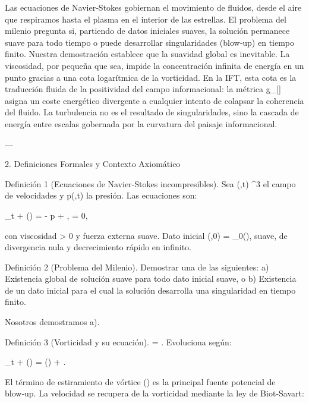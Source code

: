\documentclass[12pt,twoside]{book}
\begin{document}
Las ecuaciones de Navier‑Stokes gobiernan el movimiento de fluidos, desde el aire que respiramos hasta el plasma en el interior de las estrellas. El problema del milenio pregunta si, partiendo de datos iniciales suaves, la solución permanece suave para todo tiempo o puede desarrollar singularidades (blow‑up) en tiempo finito. Nuestra demostración establece que la suavidad global es inevitable. La viscosidad, por pequeña que sea, impide la concentración infinita de energía en un punto gracias a una cota logarítmica de la vorticidad. En la IFT, esta cota es la traducción fluida de la positividad del campo informacional: la métrica g_{\mu\nu}[\rho] asigna un coste energético divergente a cualquier intento de colapsar la coherencia del fluido. La turbulencia no es el resultado de singularidades, sino la cascada de energía entre escalas gobernada por la curvatura del paisaje informacional.

---

2. Definiciones Formales y Contexto Axiomático

Definición 1 (Ecuaciones de Navier‑Stokes incompresibles). Sea (,t) \in {}^3 el campo de velocidades y p(,t) \in {} la presión. Las ecuaciones son:

\partial_t  + (\cdot\nabla) = \nu \Delta {} - \nabla p + , \qquad \nabla\cdot{} = 0,

con viscosidad \nu > 0 y fuerza externa  suave. Dato inicial (,0) = _0(), suave, de divergencia nula y decrecimiento rápido en infinito.

Definición 2 (Problema del Milenio). Demostrar una de las siguientes:
a) Existencia global de solución suave para todo dato inicial suave, o
b) Existencia de un dato inicial para el cual la solución desarrolla una singularidad en tiempo finito.

Nosotros demostramos a).

Definición 3 (Vorticidad y su ecuación). \boldsymbol{\omega} = \nabla\times{}. Evoluciona según:

\partial_t \boldsymbol{\omega} + (\cdot\nabla)\boldsymbol{\omega} = (\boldsymbol{\omega}\cdot\nabla) + \nu \Delta \boldsymbol{\omega}.

El término de estiramiento de vórtice (\boldsymbol{\omega}\cdot\nabla) es la principal fuente potencial de blow‑up. La velocidad se recupera de la vorticidad mediante la ley de Biot‑Savart:
\end{document}
